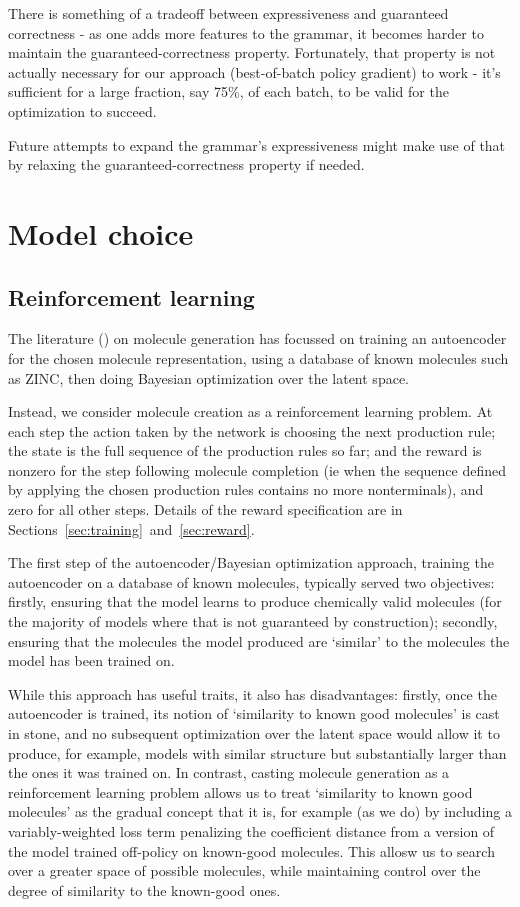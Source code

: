 \documentclass{article}
\begin{document}
There is something of a tradeoff between expressiveness and guaranteed correctness - as one adds more features to the grammar, it becomes harder to maintain the guaranteed-correctness property. Fortunately, that property is not actually necessary for our approach (best-of-batch policy gradient) to work - it's sufficient for a large fraction, say 75\%, of each batch, to be valid for the optimization to succeed.

Future attempts to expand the grammar's expressiveness might make use of that by relaxing the guaranteed-correctness property if needed.

\section{Model choice}
\subsection{Reinforcement learning}
The literature (\cite{Gomez-Bombarelli16, kusner17, jin18, kajino18}) on molecule generation has focussed on training an autoencoder for the chosen molecule representation, using a database of known molecules such as ZINC, then doing Bayesian optimization over the latent space. 

Instead, we consider molecule creation as a reinforcement learning problem. At each step the action taken by the network is choosing the next production rule; the state is the full sequence of the production rules so far; and the reward is nonzero for the step following molecule completion (ie when the sequence defined by applying the chosen production rules contains no more nonterminals), and zero for all other steps. Details of the reward specification are in Sections~\ref{sec:training}~and~\ref{sec:reward}.

The first step of the autoencoder/Bayesian optimization approach, training the autoencoder on a database of known molecules, typically served two objectives: firstly, ensuring that the model learns to produce chemically valid molecules (for the majority of models where that is not guaranteed by construction); secondly, ensuring that the molecules the model produced are `similar' to the molecules the model has been trained on.

While this approach has useful traits, it also has disadvantages: firstly, once the autoencoder is trained, its notion of `similarity to known good molecules' is cast in stone, and no subsequent optimization over the latent space would allow it to produce, for example, models with similar structure but substantially larger than the ones it was trained on. In contrast, casting molecule generation as a reinforcement learning problem allows us to treat `similarity to known good molecules' as the gradual concept that it is, for example (as we do) by including a variably-weighted loss term penalizing the coefficient distance from a version of the model trained off-policy on known-good molecules. This allosw us to search over a greater space of possible molecules, while maintaining control over the degree of similarity to the known-good ones.
\end{document}
